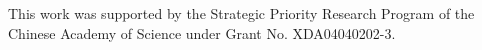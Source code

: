 \documentclass{JINST}
\begin{document}
\acknowledgments

This work was supported by the Strategic Priority Research Program of the Chinese Academy of Science under Grant No. XDA04040202-3.

\end{document}

